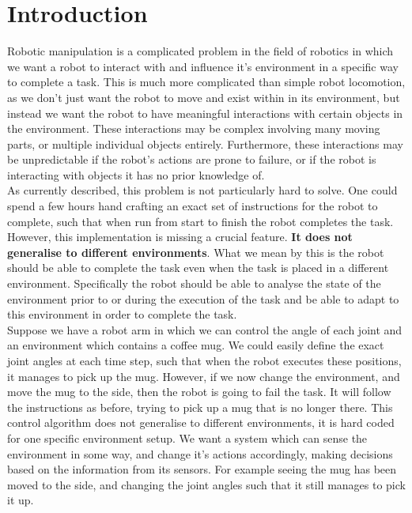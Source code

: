 \chapter{Introduction}
\label{chap:introduction}

Robotic manipulation is a complicated problem in the field of robotics in which we want a robot to interact with and influence it's environment in a specific way to complete a task. This is much more complicated than simple robot locomotion, as we don't just want the robot to move and exist within in its environment, but instead we want the robot to have meaningful interactions with certain objects in the environment. These interactions may be complex involving many moving parts, or multiple individual objects entirely. Furthermore, these interactions may be unpredictable if the robot's actions are prone to failure, or if the robot is interacting with objects it has no prior knowledge of.\\

As currently described, this problem is not particularly hard to solve. One could spend a few hours hand crafting an exact set of instructions for the robot to complete, such that when run from start to finish the robot completes the task. However, this implementation is missing a crucial feature. \textbf{It does not generalise to different environments}. What we mean by this is the robot should be able to complete the task even when the task is placed in a different environment. Specifically the robot should be able to analyse the state of the environment prior to or during the execution of the task and be able to adapt to this environment in order to complete the task.\\

Suppose we have a robot arm in which we can control the angle of each joint and an environment which contains a coffee mug. We could easily define the exact joint angles at each time step, such that when the robot executes these positions, it manages to pick up the mug. However, if we now change the environment, and move the mug to the side, then the robot is going to fail the task. It will follow the instructions as before, trying to pick up a mug that is no longer there. This control algorithm does not generalise to different environments, it is hard coded for one specific environment setup. We want a system which can sense the environment in some way, and change it's actions accordingly, making decisions based on the information from its sensors. For example seeing the mug has been moved to the side, and changing the joint angles such that it still manages to pick it up.\\

